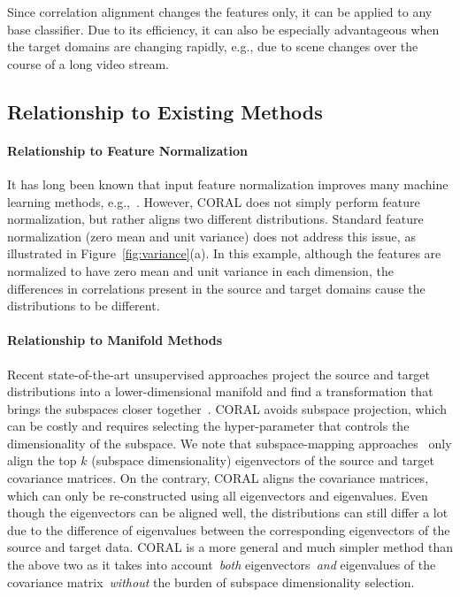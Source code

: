 \documentclass[letterpaper]{article}
\begin{document}
Since correlation alignment changes the features only, it can be applied to any base classifier. Due to its efficiency, it can also be especially advantageous when the target domains are changing rapidly, e.g., due to scene changes over the course of a long video stream.

\subsection{Relationship to Existing Methods}
\paragraph{Relationship to Feature Normalization}
It has long been known that input feature normalization improves many machine learning methods, e.g.,~\cite{batchnorm}. However, CORAL does not simply perform feature normalization, but rather aligns two different distributions. Standard feature normalization (zero mean and unit variance) does not address this issue, as illustrated in Figure~\ref{fig:variance}(a). In this example, although the features are normalized to have zero mean and unit variance in each dimension, the differences in correlations present in the source and target domains cause the distributions to be different.

\paragraph{Relationship to Manifold Methods}
 Recent state-of-the-art unsupervised approaches project the source and target distributions into a lower-dimensional manifold and find a transformation that brings the subspaces closer together~\cite{gopalan-iccv11,gfk,sasb,outlooks}. CORAL avoids subspace projection, which can be costly and requires selecting the hyper-parameter that controls the dimensionality of the subspace. We note that subspace-mapping approaches~\cite{outlooks,sasb} only align the top $k$ (subspace dimensionality) eigenvectors of the source and target covariance matrices. On the contrary, CORAL aligns the covariance matrices, which can only be re-constructed using all eigenvectors and eigenvalues. Even though the eigenvectors can be aligned well, the distributions can still differ a lot due to the difference of eigenvalues between the corresponding eigenvectors of the source and target data. CORAL is a more general and much simpler method than the above two as it takes into account~\emph{both} eigenvectors~\emph{and} eigenvalues of the covariance matrix~\emph{without} the burden of subspace dimensionality selection.
\end{document}
